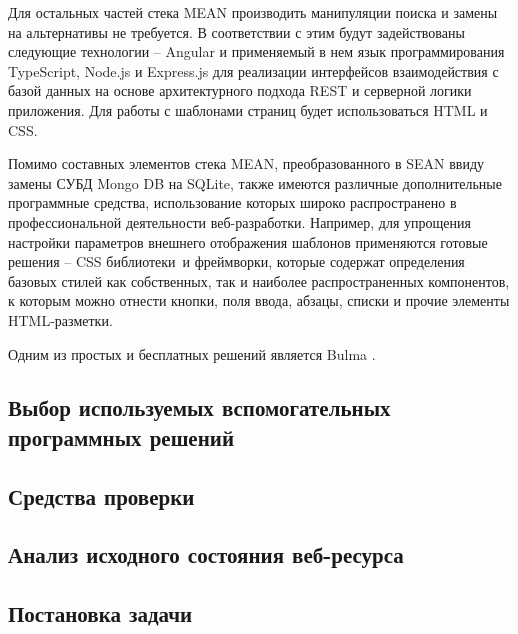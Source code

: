 Для остальных частей стека MEAN производить манипуляции поиска и замены на альтернативы не требуется.
В соответствии с этим будут задействованы следующие технологии -- Angular и применяемый в нем язык программирования TypeScript, Node.js и Express.js для реализации интерфейсов взаимодействия с базой данных на основе архитектурного подхода REST и серверной логики приложения.
Для работы с шаблонами страниц будет использоваться HTML и CSS.

Помимо составных элементов стека MEAN, преобразованного в SEAN ввиду замены СУБД Mongo DB на SQLite, также имеются различные дополнительные программные средства, использование которых широко распространено в профессиональной деятельности веб-разработки.
Например, для упрощения настройки параметров внешнего отображения шаблонов применяются готовые решения -- CSS библиотеки и фреймворки, которые содержат определения базовых стилей как собственных, так и наиболее распространенных компонентов, к которым можно отнести кнопки, поля ввода, абзацы, списки и прочие элементы HTML-разметки.

Одним из простых и бесплатных решений является Bulma \cite{bulma}.


\subsection{Выбор используемых вспомогательных программных решений}


\subsection{Средства проверки}





\subsection{Анализ исходного состояния веб-ресурса}






\subsection{Постановка задачи}



\clearpage
